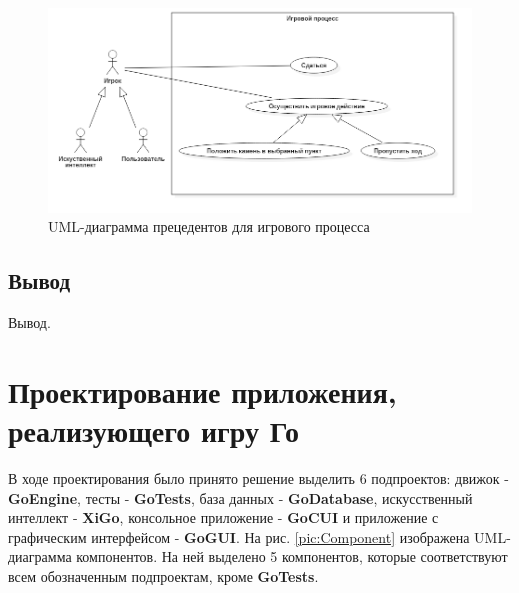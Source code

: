 \begin{figure}[H]
	\begin{center}
		\includegraphics[scale=0.545]{../UMLdiagrams/UseCase/GameProcess.png}
		\caption{UML-диаграмма прецедентов для игрового процесса} 
		\label{pic:GameProcess}
	\end{center}
\end{figure}

\subsection*{Вывод}

Вывод.

\section*{Проектирование приложения, реализующего игру Го}


В ходе проектирования было принято решение выделить 6 подпроектов: движок - \textbf{GoEngine}, тесты - \textbf{GoTests}, база данных - \textbf{GoDatabase}, 
искусственный интеллект - \textbf{XiGo}, консольное приложение - \textbf{GoCUI} и приложение с графическим интерфейсом - \textbf{GoGUI}. На рис. \ref{pic:Component} изображена UML-диаграмма компонентов. На ней выделено 5 компонентов, которые соответствуют всем обозначенным подпроектам, кроме \textbf{GoTests}.

